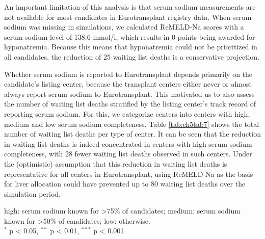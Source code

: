 \documentclass[11pt,twoside,]{book}
\begin{document}
An important limitation of this analysis is that serum sodium
measurements are not available for most candidates in Eurotransplant
registry data. When serum sodium was missing in simulations, we
calculated ReMELD-Na scores with a serum sodium level of 138.6 mmol/l,
which results in 0 points being awarded for hyponatremia. Because this
means that hyponatremia could not be prioritized in all
candidates, the reduction of 25 waiting list deaths is a
conservative projection.

Whether serum sodium is reported to Eurotransplant depends primarily on
the candidate's listing center, because the transplant centers either never or
almost always report serum sodium to Eurotransplant. This motivated us to also assess
the number of waiting list deaths stratified by the listing center's track record of reporting serum sodium. For this, we
categorize centers into centers with high, medium and low serum sodium
completeness. Table
\ref{tab:ch5tab7} shows the total number of
waiting list deaths per type of center. It can be seen that the
reduction in waiting list deaths is indeed concentrated in centers with
high serum sodium completeness, with 28 fewer waiting list deaths observed
in such centers. Under the (optimistic) assumption that this reduction in
waiting list deaths is representative for all centers in Eurotransplant,
using ReMELD-Na as the basis for liver allocation could have prevented
up to 80 waiting list deaths over the simulation period.

\begin{table}[h]
\caption{Simulated number of waiting list deaths for candidates between January 1, 2016, and January 1, 2020, under UNOS-MELD (current) and ReMELD-Na with an updated S-curve.}
\label{tab:ch5tab7}
\centering
{}
\parbox{\textwidth}{\footnotesize \smallskip high: serum sodium known for >75\% of candidates; medium: serum sodium known for >50\% of candidates; low: otherwise.\\ $^{*}$ p < 0.05, $^{**}$ p < 0.01, $^{***}$ p < 0.001}
\end{table}
\end{document}
